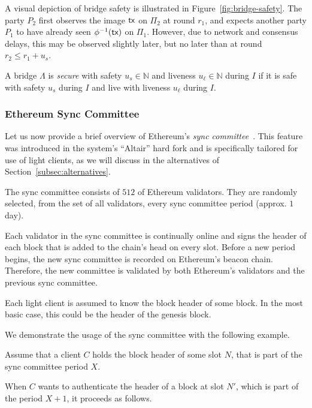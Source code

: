 A visual depiction of bridge safety is illustrated in Figure~\ref{fig:bridge-safety}.
The party $P_2$ first observes the image $\textsf{tx}$ on $\Pi_2$ at round $r_1$, and expects
another party $P_1$ to have already seen $\phi^{-1}(\textsf{tx})$ on $\Pi_1$. However, due to
network and consensus delays, this may be observed slightly later, but no later than at
round $r_2 \leq r_1 + u_s$.

\begin{definition}
  A bridge $\Lambda$ is \emph{secure} with safety $u_s \in \mathbb{N}$ and
  liveness $u_\ell \in \mathbb{N}$ during $I$ if it is safe with safety $u_s$ during $I$
  and live with liveness $u_\ell$ during $I$.
\end{definition} 


\subsubsection{Ethereum Sync Committee}

Let us now provide a brief overview of Ethereum's \emph{sync
committee}~\cite{sync-committee}. This feature was introduced in the system's
``Altair'' hard fork and is specifically tailored for use of light clients, as
we will discuss in the alternatives of Section~\ref{subsec:alternatives}.

The sync committee consists of $512$ of Ethereum validators. They are randomly
selected, from the set of all validators, every sync committee period (approx.
$1$ day).

Each validator in the sync committee is continually online and signs the header
of each block that is added to the chain's head on every slot. Before a new
period begins, the new sync committee is recorded on Ethereum's beacon chain.
Therefore, the new committee is validated by both Ethereum's validators and the
previous sync committee.

Each light client is assumed to know the block header of some block. In the
most basic case, this could be the header of the genesis block.

We demonstrate the usage of the sync committee with the following example.

Assume that a client $C$ holds the block header of some slot $N$, that is part
of the sync committee period $X$. 

When $C$ wants to authenticate the header of a block at slot $N'$, which is
part of the period $X+1$, it proceeds as follows.

